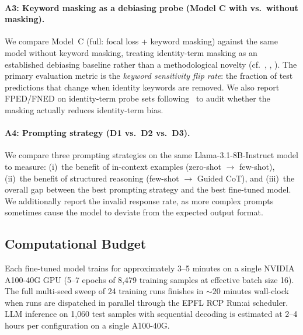 \paragraph{A3: Keyword masking as a debiasing probe (Model C with vs.\ without masking).}
We compare Model~C (full: focal loss + keyword masking) against the same model without keyword masking, treating identity-term masking as an established debiasing baseline rather than a methodological novelty (cf.~\citet{park2018reducing}, \citet{kennedy2020contextualizing}, \citet{pisterzi2023debiasing}). The primary evaluation metric is the \emph{keyword sensitivity flip rate}: the fraction of test predictions that change when identity keywords are removed. We also report FPED/FNED on identity-term probe sets following~\citet{dixon2018measuring} to audit whether the masking actually reduces identity-term bias.

\paragraph{A4: Prompting strategy (D1 vs.\ D2 vs.\ D3).}
We compare three prompting strategies on the same Llama-3.1-8B-Instruct model to measure: (i)~the benefit of in-context examples (zero-shot $\rightarrow$ few-shot), (ii)~the benefit of structured reasoning (few-shot $\rightarrow$ Guided CoT), and (iii)~the overall gap between the best prompting strategy and the best fine-tuned model. We additionally report the invalid response rate, as more complex prompts sometimes cause the model to deviate from the expected output format.

\subsection{Computational Budget}

Each fine-tuned model trains for approximately 3--5 minutes on a single NVIDIA A100-40G GPU (5--7 epochs of 8{,}479 training samples at effective batch size 16). The full multi-seed sweep of 24 training runs finishes in $\sim 20$ minutes wall-clock when runs are dispatched in parallel through the EPFL RCP Run:ai scheduler. LLM inference on 1{,}060 test samples with sequential decoding is estimated at 2--4 hours per configuration on a single A100-40G.
